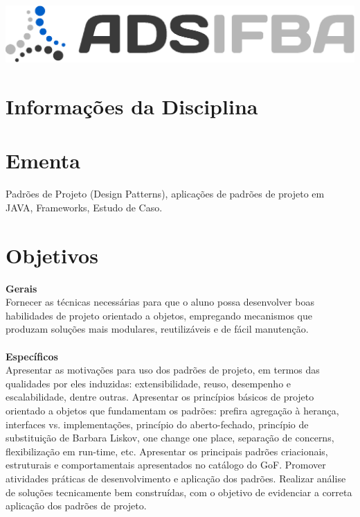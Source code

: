 \documentclass[11pt,a4paper,sans]{moderncv}
\begin{document}
\begin{center}
\includegraphics[scale=0.35,]{novo-logo-ADS.eps}
\end{center}

\makecvtitle
\vspace{-0.5cm}
\section{Informações da Disciplina}

\section{Ementa}
Padrões de Projeto (Design Patterns), aplicações de padrões de projeto em JAVA, Frameworks, Estudo de Caso.

\section{Objetivos}
\textbf{Gerais}\\
Fornecer as técnicas necessárias para que o aluno possa desenvolver boas habilidades de projeto orientado a objetos, empregando mecanismos que produzam soluções mais modulares, reutilizáveis e de fácil manutenção.
~\\~\\
\textbf{Específicos}\\
Apresentar as motivações para uso dos padrões de projeto, em termos das qualidades por eles induzidas: extensibilidade, reuso, desempenho e escalabilidade, dentre outras. Apresentar os princípios básicos de projeto orientado a objetos que fundamentam os padrões: prefira agregação à herança, interfaces vs. implementações, princípio do aberto-fechado, princípio de substituição de Barbara Liskov, one change one place, separação de concerns, flexibilização em run-time, etc. Apresentar os principais padrões criacionais, estruturais e comportamentais apresentados no catálogo do GoF. Promover atividades práticas de desenvolvimento e aplicação dos padrões. Realizar análise de soluções tecnicamente bem construídas, com o objetivo de evidenciar a correta aplicação dos padrões de projeto.
\end{document}
